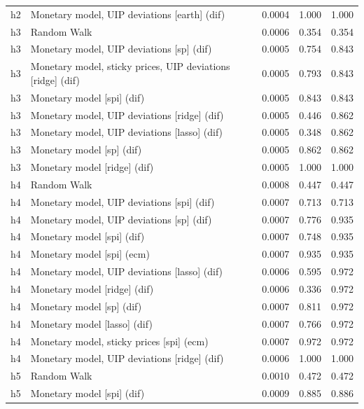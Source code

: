 \begin{ThreePartTable}
\begin{longtable}[t]{cp{5.5cm}ccc}
h2 & \raggedright Monetary model, UIP deviations [earth] (dif) & 0.0004 & 1.000 & 1.000\\
\addlinespace
h3 & \raggedright Random Walk & 0.0006 & 0.354 & 0.354\\
h3 & \raggedright Monetary model, UIP deviations [sp] (dif) & 0.0005 & 0.754 & 0.843\\
h3 & \raggedright Monetary model, sticky prices, UIP deviations [ridge] (dif) & 0.0005 & 0.793 & 0.843\\
h3 & \raggedright Monetary model [spi] (dif) & 0.0005 & 0.843 & 0.843\\
h3 & \raggedright Monetary model, UIP deviations [ridge] (dif) & 0.0005 & 0.446 & 0.862\\
h3 & \raggedright Monetary model, UIP deviations [lasso] (dif) & 0.0005 & 0.348 & 0.862\\
h3 & \raggedright Monetary model [sp] (dif) & 0.0005 & 0.862 & 0.862\\
h3 & \raggedright Monetary model [ridge] (dif) & 0.0005 & 1.000 & 1.000\\
\addlinespace
h4 & \raggedright Random Walk & 0.0008 & 0.447 & 0.447\\
h4 & \raggedright Monetary model, UIP deviations [spi] (dif) & 0.0007 & 0.713 & 0.713\\
h4 & \raggedright Monetary model, UIP deviations [sp] (dif) & 0.0007 & 0.776 & 0.935\\
h4 & \raggedright Monetary model [spi] (dif) & 0.0007 & 0.748 & 0.935\\
h4 & \raggedright Monetary model [spi] (ecm) & 0.0007 & 0.935 & 0.935\\
h4 & \raggedright Monetary model, UIP deviations [lasso] (dif) & 0.0006 & 0.595 & 0.972\\
h4 & \raggedright Monetary model [ridge] (dif) & 0.0006 & 0.336 & 0.972\\
h4 & \raggedright Monetary model [sp] (dif) & 0.0007 & 0.811 & 0.972\\
h4 & \raggedright Monetary model [lasso] (dif) & 0.0007 & 0.766 & 0.972\\
h4 & \raggedright Monetary model, sticky prices [spi] (ecm) & 0.0007 & 0.972 & 0.972\\
h4 & \raggedright Monetary model, UIP deviations [ridge] (dif) & 0.0006 & 1.000 & 1.000\\
\addlinespace
h5 & \raggedright Random Walk & 0.0010 & 0.472 & 0.472\\
h5 & \raggedright Monetary model [spi] (dif) & 0.0009 & 0.885 & 0.886\\

\end{longtable}
\end{ThreePartTable}
